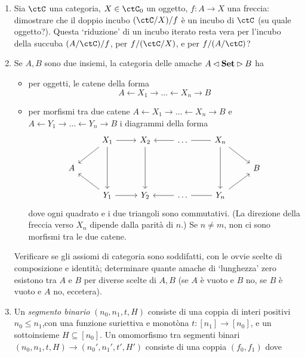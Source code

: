 \begin{enumerate}
	\item Sia $\ctC$ una categoria, $X\in\ctC_0$ un oggetto, $f : A\to X$ una freccia: dimostrare che il doppio incubo $(\ctC/X)/f$ è un incubo di $\ctC$ (su quale oggetto?). Questa `riduzione' di un incubo iterato resta vera per l'incubo della succuba $(A/\ctC)/f$, per $f/(\ctC/X)$, e per $f/(A/\ctC)$?
	\item Se $A,B$ sono due insiemi, la categoria delle amache $A\lhd\mathbf{Set}\rhd B$ ha 
	\begin{itemize}
		\item per oggetti, le catene della forma 
		\[A \leftarrow X_1 \to \dots \leftarrow X_n \to B\]
		\item per morfismi tra due catene $A \leftarrow X_1 \to \dots \leftarrow X_n \to B$ e $A \leftarrow Y_1 \to \dots \leftarrow Y_n \to B$ i diagrammi della forma
\[\begin{tikzcd}
	& {X_1} & {X_2} & \dots & {X_n} \\
	A &&&&& B \\
	& {Y_1} & {Y_2} & \dots & {Y_n}
	\arrow[from=1-2, to=2-1]
	\arrow[from=3-2, to=2-1]
	\arrow[from=1-2, to=1-3]
	\arrow[from=1-5, to=2-6]
	\arrow[from=3-5, to=2-6]
	\arrow[from=1-4, to=1-3]
	\arrow[no head, from=1-4, to=1-5]
	\arrow[from=3-2, to=3-3]
	\arrow[from=3-4, to=3-3]
	\arrow[no head, from=3-4, to=3-5]
	\arrow[from=1-2, to=3-2]
	\arrow[from=1-3, to=3-3]
	\arrow[from=1-5, to=3-5]
\end{tikzcd}\]
dove ogni quadrato e i due triangoli sono commutativi. (La direzione della freccia verso $X_n$ dipende dalla parità di $n$.) Se $n\ne m$, non ci sono morfismi tra le due catene.
\end{itemize}
Verificare se gli assiomi di categoria sono soddifatti, con le ovvie scelte di composizione e identità; determinare quante amache di `lunghezza' zero esistono tra $A$ e $B$ per diverse scelte di $A,B$ (se $A$ è vuoto e $B$ no, se $B$ è vuoto e $A$ no, eccetera).
	\item Un \emph{segmento binario} $(n_0,n_1,t,H)$ consiste di una coppia di interi positivi $n_0 \le n_1$,con una funzione suriettiva e monotòna $t : [n_1] \to [n_0]$, e un sottoinsieme $H\subseteq [n_0]$. Un omomorfismo tra segmenti binari $(n_0,n_1,t,H) \to (n_0',n_1',t',H')$ consiste di una coppia $(f_0,f_1)$ dove 

\end{enumerate}
